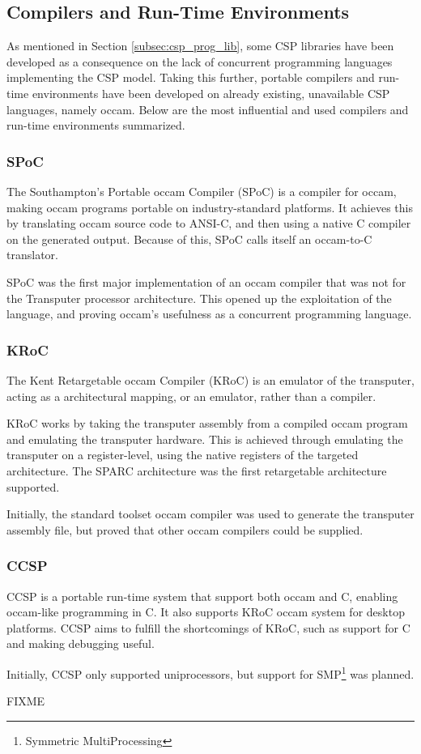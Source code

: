 \subsection{Compilers and Run-Time Environments}
\label{subsec:csp_comp_runtime}

As mentioned in Section \ref{subsec:csp_prog_lib}, some CSP libraries have been developed as a consequence on the lack of concurrent programming languages implementing the CSP model. Taking this further, portable compilers and run-time environments have been developed on already existing, unavailable CSP languages, namely occam. Below are the most influential and used compilers and run-time environments summarized. 


\subsubsection{SPoC}
\label{sssec:spoc}

The Southampton's Portable occam Compiler (SPoC) \citep{spoc} is a compiler for occam, making occam programs portable on industry-standard platforms. It achieves this by translating occam source code to ANSI-C, and then using a native C compiler on the generated output. Because of this, SPoC calls itself an occam-to-C translator. 

SPoC was the first major implementation of an occam compiler that was not for the Transputer processor architecture. This opened up the exploitation of the language, and proving occam's usefulness as a concurrent programming language.


\subsubsection{KRoC}
\label{sssec:kroc}

The Kent Retargetable occam Compiler (KRoC) \citep{kroc} is an emulator of the transputer, acting as a architectural mapping, or an emulator, rather than a compiler.

KRoC works by taking the transputer assembly from a compiled occam program and emulating the transputer hardware. This is achieved through emulating the transputer on a register-level, using the native registers of the targeted architecture. The SPARC architecture was the first retargetable architecture supported. 

Initially, the standard toolset occam compiler was used to generate the transputer assembly file, but proved that other occam compilers could be supplied. 


\subsubsection{CCSP}
\label{sssec:ccsp}

CCSP \citep{ccsp} is a portable run-time system that support both occam and C, enabling occam-like programming in C. It also supports KRoC occam system for desktop platforms. CCSP aims to fulfill the shortcomings of KRoC, such as support for C and making debugging useful.

Initially, CCSP only supported uniprocessors, but support for SMP\footnote{Symmetric MultiProcessing} was planned. 

FIXME